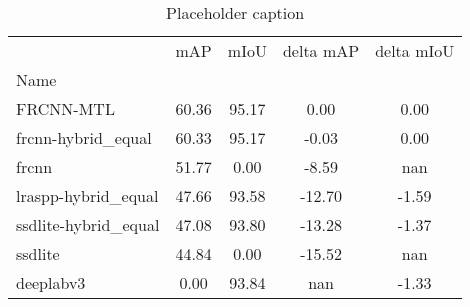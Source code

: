 \begin{table}[htbp]
\centering
\caption{Placeholder caption}
\label{tab:singlevsmulti}
\begin{tabular}{lcccc}
\toprule
 & mAP & mIoU & delta mAP & delta mIoU \\
Name &  &  &  &  \\
\midrule
FRCNN-MTL & 60.36 & 95.17 & 0.00 & 0.00 \\
frcnn-hybrid_equal & 60.33 & 95.17 & -0.03 & 0.00 \\
frcnn & 51.77 & 0.00 & -8.59 & nan \\
lraspp-hybrid_equal & 47.66 & 93.58 & -12.70 & -1.59 \\
ssdlite-hybrid_equal & 47.08 & 93.80 & -13.28 & -1.37 \\
ssdlite & 44.84 & 0.00 & -15.52 & nan \\
deeplabv3 & 0.00 & 93.84 & nan & -1.33 \\
\bottomrule
\end{tabular}
\end{table}
